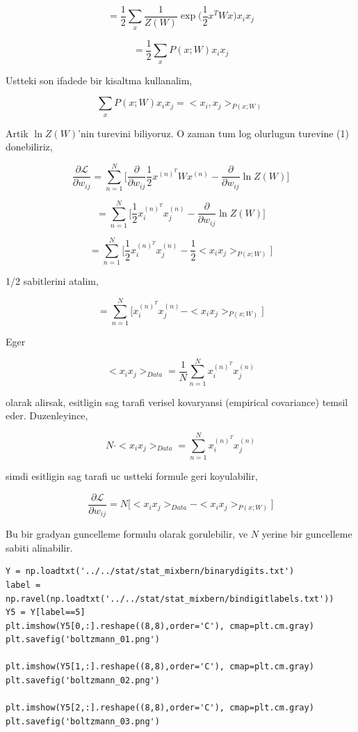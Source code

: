 \documentclass[12pt,fleqn]{article}\usepackage{../common}
\begin{document}
$$ 
= 
\frac{1}{2}  \sum_x \frac{1}{Z(W)}  \exp \big( \frac{1}{2} x^T W x \big) x_i x_j
$$

$$ 
= 
\frac{1}{2}  \sum_x P(x;W) x_i x_j
$$

Ustteki son ifadede bir kisaltma kullanalim,

$$ 
\sum_x P(x;W) x_i x_j =  <x_i,x_j>_{P(x;W)}
$$

Artik $\ln Z(W)$'nin turevini biliyoruz. O zaman tum log olurlugun turevine
(1) donebiliriz, 

$$  
\frac{\partial \mathcal{L}}{\partial w_{ij}} = 
\sum _{n=1}^{N} \bigg[ 
\frac{\partial}{\partial w_{ij}}  \frac{1}{2} x^{(n)^T} W x^{(n)} - 
\frac{\partial}{\partial w_{ij}}  \ln Z(W) \bigg]
$$


$$  
=
\sum _{n=1}^{N} 
\bigg[ 
\frac{1}{2} x_i^{(n)^T}x_j^{(n)} - 
\frac{\partial}{\partial w_{ij}}  \ln Z(W) 
\bigg]
$$

$$  
=
\sum _{n=1}^{N} 
\bigg[ 
\frac{1}{2} x_i^{(n)^T}x_j^{(n)} - 
\frac{1}{2}<x_ix_j>_{P(x;W)}
\bigg]
$$

1/2 sabitlerini atalim, 

$$  
=
\sum _{n=1}^{N} 
\bigg[ 
 x_i^{(n)^T}x_j^{(n)} - <x_ix_j>_{P(x;W)}
\bigg]
$$

Eger 

$$
<x_ix_j>_{Data} = \frac{1}{N} \sum _{n=1}^{N}  x_i^{(n)^T}x_j^{(n)}
$$

olarak alirsak, esitligin sag tarafi verisel kovaryansi (empirical
covariance) temsil eder. Duzenleyince,

$$ 
N \cdot <x_ix_j>_{Data} = \sum _{n=1}^{N}  x_i^{(n)^T}x_j^{(n)}
$$

simdi esitligin sag tarafi uc ustteki formule geri koyulabilir,

$$ 
\frac{\partial \mathcal{L}}{\partial w_{ij}}  = 
N \big[<x_ix_j>_{Data}  - <x_ix_j>_{P(x;W)} \big] 
$$

Bu bir gradyan guncelleme formulu olarak gorulebilir, ve $N$ yerine bir
guncelleme sabiti alinabilir. 

\begin{verbatim}
Y = np.loadtxt('../../stat/stat_mixbern/binarydigits.txt')
label = np.ravel(np.loadtxt('../../stat/stat_mixbern/bindigitlabels.txt'))
Y5 = Y[label==5]
plt.imshow(Y5[0,:].reshape((8,8),order='C'), cmap=plt.cm.gray)
plt.savefig('boltzmann_01.png')

plt.imshow(Y5[1,:].reshape((8,8),order='C'), cmap=plt.cm.gray)
plt.savefig('boltzmann_02.png')

plt.imshow(Y5[2,:].reshape((8,8),order='C'), cmap=plt.cm.gray)
plt.savefig('boltzmann_03.png')
\end{verbatim}
\end{document}
